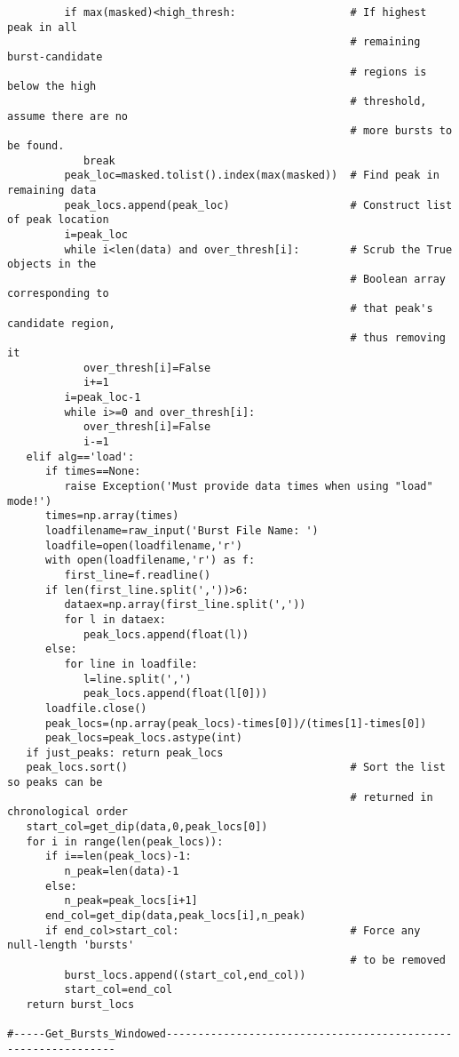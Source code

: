 \begin{verbatim}
         if max(masked)<high_thresh:                  # If highest peak in all
                                                      # remaining burst-candidate
                                                      # regions is below the high
                                                      # threshold, assume there are no
                                                      # more bursts to be found.
            break
         peak_loc=masked.tolist().index(max(masked))  # Find peak in remaining data
         peak_locs.append(peak_loc)                   # Construct list of peak location
         i=peak_loc
         while i<len(data) and over_thresh[i]:        # Scrub the True objects in the 
                                                      # Boolean array corresponding to 
                                                      # that peak's candidate region,
                                                      # thus removing it
            over_thresh[i]=False
            i+=1
         i=peak_loc-1
         while i>=0 and over_thresh[i]:
            over_thresh[i]=False
            i-=1
   elif alg=='load':
      if times==None:
         raise Exception('Must provide data times when using "load" mode!')
      times=np.array(times)
      loadfilename=raw_input('Burst File Name: ')
      loadfile=open(loadfilename,'r')
      with open(loadfilename,'r') as f:
         first_line=f.readline()
      if len(first_line.split(','))>6:
         dataex=np.array(first_line.split(','))    
         for l in dataex:
            peak_locs.append(float(l))  
      else:
         for line in loadfile:
            l=line.split(',')
            peak_locs.append(float(l[0]))
      loadfile.close()
      peak_locs=(np.array(peak_locs)-times[0])/(times[1]-times[0])
      peak_locs=peak_locs.astype(int)
   if just_peaks: return peak_locs
   peak_locs.sort()                                   # Sort the list so peaks can be 
                                                      # returned in chronological order
   start_col=get_dip(data,0,peak_locs[0])
   for i in range(len(peak_locs)):
      if i==len(peak_locs)-1:
         n_peak=len(data)-1
      else:
         n_peak=peak_locs[i+1]
      end_col=get_dip(data,peak_locs[i],n_peak)
      if end_col>start_col:                           # Force any null-length 'bursts'
                                                      # to be removed
         burst_locs.append((start_col,end_col))
         start_col=end_col
   return burst_locs

#-----Get_Bursts_Windowed--------------------------------------------------------------


\end{verbatim}
